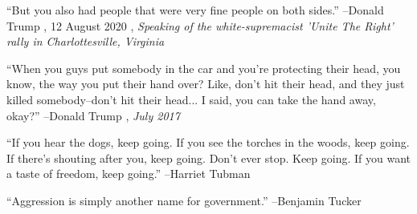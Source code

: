 \documentclass{article}%
\begin{document}
\linebreak%
\vspace{1mm}%
\begin{minipage}{\textwidth}%
\flushleft%
“But you also had people that were very fine people on both sides.”%
\linebreak%
\vspace{1mm}%
–Donald Trump%
, 12 August 2020%
, \textit{Speaking of the white-supremacist 'Unite The Right' rally in Charlottesville, Virginia}%
\linebreak%
\vspace{1mm}%
\end{minipage}%
\linebreak%
\vspace{1mm}%
\begin{minipage}{\textwidth}%
\flushleft%
“When you guys put somebody in the car and you're protecting their head, you know, the way you put their hand over? Like, don't hit their head, and they just killed somebody–don't hit their head... I said, you can take the hand away, okay?”%
\linebreak%
\vspace{1mm}%
–Donald Trump%
, \textit{July 2017}%
\linebreak%
\vspace{1mm}%
\end{minipage}%
\linebreak%
\vspace{1mm}%
\begin{minipage}{\textwidth}%
\flushleft%
“If you hear the dogs, keep going. If you see the torches in the woods, keep going. If there's shouting after you, keep going. Don't ever stop. Keep going. If you want a taste of freedom, keep going.”%
\linebreak%
\vspace{1mm}%
–Harriet Tubman%
\linebreak%
\vspace{1mm}%
\end{minipage}%
\linebreak%
\vspace{1mm}%
\begin{minipage}{\textwidth}%
\flushleft%
“Aggression is simply another name for government.”%
\linebreak%
\vspace{1mm}%
–Benjamin Tucker%
\linebreak%
\vspace{1mm}%
\end{minipage}%
\linebreak%
\end{document}
